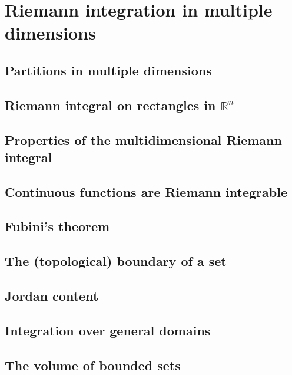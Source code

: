 \section{Riemann integration in multiple dimensions}

\subsection{Partitions in multiple dimensions}

\subsection{Riemann integral on rectangles in $\mathbb{R}^n$}

\subsection{Properties of the multidimensional Riemann integral}

\subsection{Continuous functions are Riemann integrable}

\subsection{Fubini's theorem}

\subsection{The (topological) boundary of a set}

\subsection{Jordan content}

\subsection{Integration over general domains}

\subsection{The volume of bounded sets}
